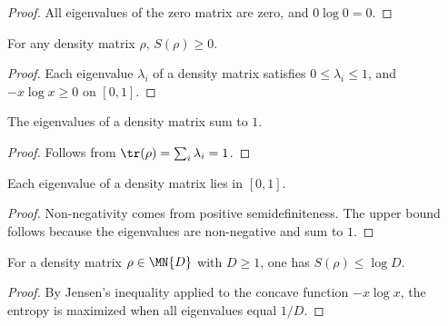 \begin{proof}\leanok
    All eigenvalues of the zero matrix are zero, and $0\log 0=0$.
\end{proof}

\begin{theorem}\label{thm:entropy_nonneg}
    \leanok
    For any density matrix $\rho$, $S(\rho)\ge0$.
\end{theorem}

\begin{proof}\leanok
    Each eigenvalue $\lambda_i$ of a density matrix satisfies
    $0\le\lambda_i\le1$, and $-x\log x\ge0$ on $[0,1]$.
\end{proof}

\begin{lemma}\label{lem:density_eigenvalues_sum}
    \leanok
    The eigenvalues of a density matrix sum to $1$.
\end{lemma}

\begin{proof}\leanok
    Follows from $\tr(\rho)=\sum_i\lambda_i=1$.
\end{proof}

\begin{theorem}\label{thm:density_eigenvalues_le_one}
    \leanok
    Each eigenvalue of a density matrix lies in $[0,1]$.
\end{theorem}

\begin{proof}\leanok
    Non-negativity comes from positive semidefiniteness. The upper bound
    follows because the eigenvalues are non-negative and sum to $1$.
\end{proof}

\begin{theorem}\label{thm:entropy_le_log_dim}
    \leanok
    For a density matrix $\rho\in\MN{D}$ with $D\ge1$, one has
    $S(\rho)\le\log D$.
\end{theorem}

\begin{proof}\leanok
    By Jensen's inequality applied to the concave function $-x\log x$,
    the entropy is maximized when all eigenvalues equal $1/D$.
\end{proof}

